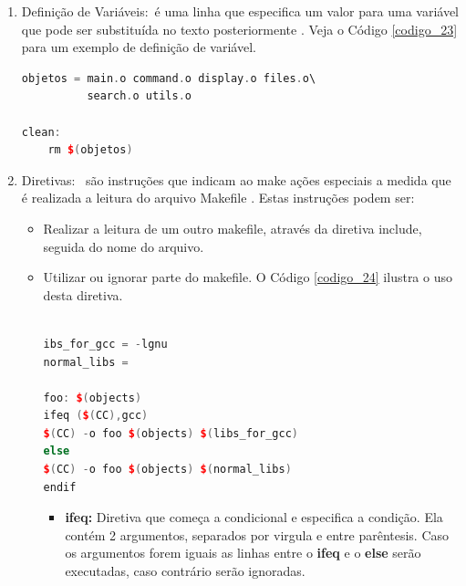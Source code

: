 \begin{enumerate}
\begin{lstlisting}[language=C++,frame=single,captionpos=b,caption={ 
                          Exemplo de utilização de padrões no Makefile},
                                                        label=codigo_22]
    \end{lstlisting}


    \item Definição de Variáveis:\
 é uma linha que especifica um valor para uma variável que pode ser substituída no
 texto posteriormente \cite{ref43}. Veja o Código \ref{codigo_23} para um exemplo de 
definição de variável.

    \begin{lstlisting}[language=C++,frame=single,captionpos=b,caption={ 
                                     Definição de variavel e utilização},
                                                         label=codigo_23]
objetos = main.o command.o display.o files.o\
          search.o utils.o

clean:
    rm $(objetos)
    \end{lstlisting}


    \item Diretivas: \
são instruções que indicam ao make ações especiais a medida que é realizada a leitura do
 arquivo Makefile \cite{ref43}. Estas instruções podem ser:

    \begin{itemize}
        \item Realizar a leitura de um outro makefile, através da diretiva include, seguida do nome do arquivo.
        \item Utilizar ou ignorar parte do makefile.\cite{ref43} O Código \ref{codigo_24} ilustra o uso desta diretiva. 


    \begin{lstlisting}[language=C++,frame=single,captionpos=b,caption={ 
                             Exemplo Make file com diretiva condicional},
                                                         label=codigo_24]

ibs_for_gcc = -lgnu
normal_libs =

foo: $(objects)
ifeq ($(CC),gcc)
$(CC) -o foo $(objects) $(libs_for_gcc)
else
$(CC) -o foo $(objects) $(normal_libs)
endif

    \end{lstlisting}

    \begin{itemize}
        \item \textbf{ifeq:} Diretiva que começa a condicional e especifica a 
    condição. Ela contém 2 argumentos, separados por virgula e entre parêntesis.
     Caso os argumentos forem iguais as linhas entre o \textbf{ifeq} e o
     \textbf{else} serão executadas, caso contrário serão ignoradas\cite{ref50}.


\end{itemize}
\end{itemize}
\end{enumerate}
